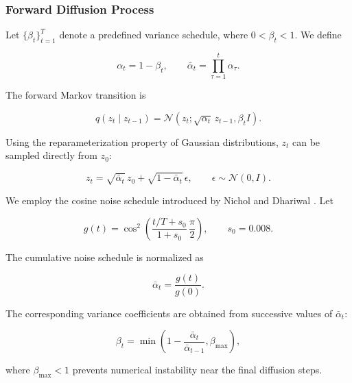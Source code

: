 \documentclass[journal]{IEEEtran}
\begin{document}
\subsubsection{Forward Diffusion Process}

Let \(\{\beta_t\}_{t=1}^{T}\) denote a predefined variance schedule,
where \(0<\beta_t<1\). We define

\begin{equation}
\alpha_t=1-\beta_t,
\qquad
\bar{\alpha}_t=\prod_{\tau=1}^{t}\alpha_\tau.
\label{eq:alpha_definition}
\end{equation}

The forward Markov transition is

\begin{equation}
q(z_t\mid z_{t-1})
=
\mathcal{N}
\left(
z_t;
\sqrt{\alpha_t}\,z_{t-1},
\beta_t I
\right).
\label{eq:forward_transition}
\end{equation}

Using the reparameterization property of Gaussian distributions,
\(z_t\) can be sampled directly from \(z_0\):

\begin{equation}
z_t
=
\sqrt{\bar{\alpha}_t}\,z_0
+
\sqrt{1-\bar{\alpha}_t}\,\epsilon,
\qquad
\epsilon\sim\mathcal{N}(0,I).
\label{eq:forward}
\end{equation}

We employ the cosine noise schedule introduced by Nichol and Dhariwal
\cite{nichol2021improveddenoisingdiffusionprobabilistic}. Let

\begin{equation}
g(t)
=
\cos^2
\left(
\frac{t/T+s_0}{1+s_0}\,
\frac{\pi}{2}
\right),
\qquad s_0=0.008.
\label{eq:cosine_function}
\end{equation}

The cumulative noise schedule is normalized as

\begin{equation}
\bar{\alpha}_t
=
\frac{g(t)}{g(0)}.
\label{eq:cosine_schedule}
\end{equation}

The corresponding variance coefficients are obtained from successive
values of \(\bar{\alpha}_t\):

\begin{equation}
\beta_t
=
\min
\left(
1-
\frac{\bar{\alpha}_t}{\bar{\alpha}_{t-1}},
\beta_{\max}
\right),
\label{eq:cosine_beta}
\end{equation}

where \(\beta_{\max}<1\) prevents numerical instability near the final
diffusion steps.
\end{document}
